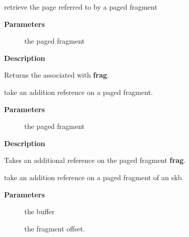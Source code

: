 \documentclass[a4paper,8pt,english]{sphinxmanual}
\begin{document}
\begin{fulllineitems}
\label{networking/kapi:c.skb_frag_page}
retrieve the page referred to by a paged fragment

\end{fulllineitems}


\textbf{Parameters}
\begin{description}
\item[{}] \leavevmode
the paged fragment

\end{description}

\textbf{Description}

Returns the  associated with \textbf{frag}.

\begin{fulllineitems}
\label{networking/kapi:c.__skb_frag_ref}
take an addition reference on a paged fragment.

\end{fulllineitems}


\textbf{Parameters}
\begin{description}
\item[{}] \leavevmode
the paged fragment

\end{description}

\textbf{Description}

Takes an additional reference on the paged fragment \textbf{frag}.

\begin{fulllineitems}
\label{networking/kapi:c.skb_frag_ref}
take an addition reference on a paged fragment of an skb.

\end{fulllineitems}


\textbf{Parameters}
\begin{description}
\item[{}] \leavevmode
the buffer

\item[{}] \leavevmode
the fragment offset.

\end{description}
\end{document}
